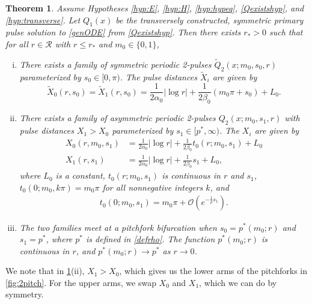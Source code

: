 \documentclass[12pt]{elsarticle}
\theoremstyle{plain}
\newtheorem{theorem}{Theorem}
\theoremstyle{definition}
\theoremstyle{remark}
\numberwithin{theorem}{section}
\numberwithin{equation}{section}
\begin{document}
\begin{theorem}\label{2pulsebifurcation}
Assume Hypotheses \ref{hyp:E}, \ref{hyp:H}, \ref{hyp:hypeq}, \ref{Qexistshyp}, and \ref{hyp:transverse}. Let $Q_1(x)$ be the transversely constructed, symmetric primary pulse solution to \cref{genODE} from \cref{Qexistshyp}. Then there exists $r_* > 0$ such that for all $r \in \mathcal{R}$ with $r \leq r_*$ and $m_0 \in \{0, 1\}$,
\begin{enumerate}[(i)]
	\item There exists a family of symmetric periodic 2-pulses $\tilde{Q}_2(x; m_0, s_0, r)$ parameterized by $s_0 \in [0, \pi)$. The pulse distances $\tilde{X}_i$ are given by
	\begin{equation}\label{2psymmdist}
		\tilde{X}_0(r, s_0) = \tilde{X}_1(r, s_0) = \frac{1}{2 \alpha_0} |\log r| + \frac{1}{2\beta_0} (m_0 \pi + s_0) + L_0.
	\end{equation}
	\item There exists a family of asymmetric periodic 2-pulses $Q_2(x; m_0, s_1, r)$ with pulse distances $X_1 > X_0$ parameterized by $s_1 \in [p^*, \infty)$. The $X_i$ are given by
	\begin{equation}\label{2pasymmdist}
	\begin{aligned}
		X_0(r, m_0, s_1) &= \frac{1}{2 \alpha_0} |\log r| + \frac{1}{2\beta_0} t_0(r; m_0, s_1) + L_0 \\
		X_1(r, s_1) &= \frac{1}{2 \alpha_0} |\log r| + \frac{1}{2\beta_0} s_1 + L_0, 
	\end{aligned}
	\end{equation}
	where $L_0$ is a constant, $t_0(r; m_0, s_1)$ is continuous in $r$ and $s_1$, $t_0(0; m_0, k \pi) = m_0 \pi$ for all nonnegative integers $k$, and 
	\begin{align}\label{t0est}
	t_0(0; m_0, s_1) = m_0 \pi + \mathcal{O}\left(e^{-\frac{1}{\rho} s_1 }\right).
	\end{align}

	\item The two families meet at a pitchfork bifurcation when $s_0 = p^*(m_0; r)$ and $s_1 = p^*$, where $p^*$ is defined in \cref{defrho}. The function $p^*(m_0; r)$ is continuous in $r$, and $p^*(m_0; r) \rightarrow p^*$ as $r \rightarrow 0$.
\end{enumerate}
\end{theorem}

\noi We note that in \cref{2pulsebifurcation}(ii), $X_1 > X_0$, which gives us the lower arms of the pitchforks in \cref{fig:2pitch}. For the upper arms, we swap $X_0$ and $X_1$, which we can do by symmetry.
\end{document}
